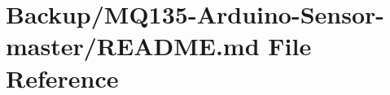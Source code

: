 \hypertarget{_backup_2_m_q135-_arduino-_sensor-master_2_r_e_a_d_m_e_8md}{}\section{Backup/\+M\+Q135-\/\+Arduino-\/\+Sensor-\/master/\+R\+E\+A\+D\+ME.md File Reference}
\label{_backup_2_m_q135-_arduino-_sensor-master_2_r_e_a_d_m_e_8md}
